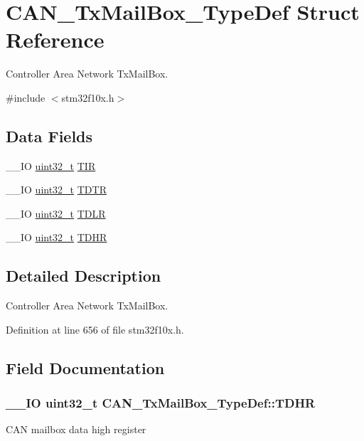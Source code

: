 \hypertarget{struct_c_a_n___tx_mail_box___type_def}{\section{C\-A\-N\-\_\-\-Tx\-Mail\-Box\-\_\-\-Type\-Def Struct Reference}
\label{struct_c_a_n___tx_mail_box___type_def}
}


Controller Area Network Tx\-Mail\-Box.  




{\ttfamily \#include $<$stm32f10x.\-h$>$}

\subsection*{Data Fields}
\begin{DoxyCompactItemize}
\item 
\-\_\-\-\_\-\-I\-O \hyperlink{stdint_8h_a435d1572bf3f880d55459d9805097f62}{uint32\-\_\-t} \hyperlink{struct_c_a_n___tx_mail_box___type_def_a22f525c909de2dcec1d4093fe1d562b8}{T\-I\-R}
\item 
\-\_\-\-\_\-\-I\-O \hyperlink{stdint_8h_a435d1572bf3f880d55459d9805097f62}{uint32\-\_\-t} \hyperlink{struct_c_a_n___tx_mail_box___type_def_a2351cb865d064cf75f61642aaa887f76}{T\-D\-T\-R}
\item 
\-\_\-\-\_\-\-I\-O \hyperlink{stdint_8h_a435d1572bf3f880d55459d9805097f62}{uint32\-\_\-t} \hyperlink{struct_c_a_n___tx_mail_box___type_def_a408c96501b1cc8bd527432736d132a39}{T\-D\-L\-R}
\item 
\-\_\-\-\_\-\-I\-O \hyperlink{stdint_8h_a435d1572bf3f880d55459d9805097f62}{uint32\-\_\-t} \hyperlink{struct_c_a_n___tx_mail_box___type_def_a98c6bcd7c9bae378ebf83fd9f5b59020}{T\-D\-H\-R}
\end{DoxyCompactItemize}


\subsection{Detailed Description}
Controller Area Network Tx\-Mail\-Box. 

Definition at line 656 of file stm32f10x.\-h.



\subsection{Field Documentation}
\hypertarget{struct_c_a_n___tx_mail_box___type_def_a98c6bcd7c9bae378ebf83fd9f5b59020}{
\subsubsection[{T\-D\-H\-R}]{\setlength{\rightskip}{0pt plus 5cm}\-\_\-\-\_\-\-I\-O {\bf uint32\-\_\-t} C\-A\-N\-\_\-\-Tx\-Mail\-Box\-\_\-\-Type\-Def\-::\-T\-D\-H\-R}}\label{struct_c_a_n___tx_mail_box___type_def_a98c6bcd7c9bae378ebf83fd9f5b59020}
C\-A\-N mailbox data high register 

